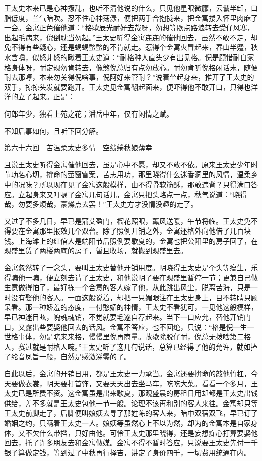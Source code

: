 \documentclass[12pt,UTF8]{ctexbook}
\begin{document}
{{{王太史本来已是心神撩乱，也听不清他说的什么，只见他星眼微朦，云鬟半卸，口脂低度，兰气暗吹。忍不住心神荡漾，便把两手合抱拢来，把金寓搂入怀里肉麻了一会。金寓正色催他道：“格歇辰光耐好去哉呀，勿想等歇点路浪转去受仔风寒，出起毛病来，倪倒耽当勿起。”王太史听得金寓连连的催他回去，虽然不敢不走，却免不得有些疑心，还是蝎蝎螫螫的不肯就走。惹得个金寓火冒起来，春山半蹙，秋水含嗔，似怒非怒的瞅着王太史道：“耐格种人直头少有出见格。倪是顾惜耐自家格身体呀，耐定规勿肯转去，像煞倪总归有点勿放心。耐勿肯听倪格闲话末，随便耐去那哼，本来勿关得倪啥事，倪阿好来管耐？”说着坐起身来，推开了王太史的双手，掠掠头发就要跑开。王太史见金寓翻起面来，便吓得他不敢开口，只得也洋洋的立了起来。正是：

何郎年少，独看上苑之花；潘岳中年，仅有闲情之赋。

不知后事如何，且听下回分解。





第六十六回　苦温柔太史多情　空缋绻秋娘薄幸





且说王太史听得金寓催他回去，虽是心中不愿，却又不敢不依。原来王太史少年时节功名心切，拚命的萤窗雪案，苦志用功，那里晓得什么迷香洞里的风情，温柔乡中的况味？所以现在见了金寓这般模样，由不得骨软筋酥，那敢违背？只得满口答应。立起身来又叮嘱了金寓几句话儿，金寓只把头略点一点，秋气说道：“晓得哉，勿要多烦哉，豪燥点去罢！”王太史方才没情没趣的走了。

又过了不多几日，早已是蒲艾盈门，榴花照眼，薰风送暖，午节将临。王太史免不得要在金寓那里报效几个双台。除了照例开销之外，金寓还格外向他借了几百块钱。上海滩上的红倌人是端阳节后照例要歇夏的，金寓也把公阳里的房子回了，在观盛里赁了两楼两底的房子，暂且收场，就搬到观盛里去。

金寓忽然转了一念头，要叫王太史替他开销用度。明晓得王太史是个头等瘟生，乐得骗他一骗，便立刻去请了王太史，和他说明了要在观盛里暂停一节；更兼自己做生意做得怕了，最好拣一个合意的客人嫁了他，从此跳出风尘，脱离苦海，只是一时没有娶他的客人。一面这般说着，却把一只媚眼注在王太史身上，目不转睛只顾呆看。那一种娇羞的态度，一付憨媚的神情，王太史不看犹可，一见他这般模样，早已神迷目眩，魄魂魂销，不觉就要毛遂自荐起来。当下一口应允，替他开销门口，又露出些要娶他回去的话风。金寓不答应，也不回绝，只说：“格是倪一生一世格事体，勿是瞎来来格，慢慢里倪再商量。故歇除脱仔耐，倪总无拨啥第二格人，赛过就是耐格人啘。”王太史听了这几句说话，总算已经得了他的允许，就如捧了纶音凤旨一般，自然是感激涕零的了。

自此以后，金寓的开销日用，都是王太史一力承当。金寓还要拚命的敲他竹杠，今天要做衣裳，明天要打首饰，又要天天出去坐马车，吃吃大菜。看看一个多月，王太史已是所费不资。这金寓虽是出来歇夏，那观盛晨的房租日用却都是王太史出钱供给，差不多就是王太史包他一节一般。论理不该再和别的客人来往。金寓却只等王太史前脚走了，后脚便叫娘姨去寻了那姓陈的客人来，暗中双宿双飞，早已订了婚姻之约，只瞒着王太史一人。娘姨等虽然心上不以为然，却为的金寓本是自家身体，又不欠什么带挡，只好由他。可怜王太史那里晓得，还是妄想痴心打算要娶他回去，托了许多朋友去和金寓做媒。金寓不得不暂时答应，只说要王太史先付一千银子算做定钱，等到过了中秋再行择吉，讲定了身价四千，一切费用统通在内。

}}}
\end{document}
